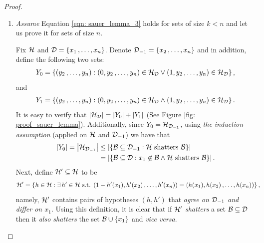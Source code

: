 \documentclass[11pt]{article}
\begin{document}
\begin{itemize}
\begin{proof}
\begin{enumerate}
\item  \emph{Assume} Equation \eqref{eqn: sauer_lemma_3} holds for sets of size $k < n$ and let us prove it for sets of size $n$. 

Fix ${\mathcal H}$ and ${\mathcal D} = \left\{x_1 \,{,}\ldots{,}\, x_n\right\}$. Denote ${\mathcal D}_{-1} = \left\{x_2 \,{,}\ldots{,}\, x_n\right\}$ and in addition, define the
following two sets:
\begin{align*}
Y_{0} = \left\{(y_2 \,{,}\ldots{,}\, y_n): (0, y_2 \,{,}\ldots{,}\, y_n) \in {\mathcal H}_{{\mathcal D}} \lor  (1, y_2 \,{,}\ldots{,}\, y_n) \in {\mathcal H}_{{\mathcal D}}\right\},
\end{align*}
and
\begin{align*}
Y_{1} = \left\{(y_2 \,{,}\ldots{,}\, y_n): (0, y_2 \,{,}\ldots{,}\, y_n) \in {\mathcal H}_{{\mathcal D}} \land  (1, y_2 \,{,}\ldots{,}\, y_n) \in {\mathcal H}_{{\mathcal D}}\right\}.
\end{align*}
It is easy to verify that $\left\lvert {\mathcal H}_{{\mathcal D}} \right\rvert = \left\lvert Y_0 \right\rvert + \left\lvert Y_1 \right\rvert$ (See Figure \ref{fig: proof_sauer_lemma}). Additionally, since $Y_0 = {\mathcal H}_{{\mathcal D}_{-1}}$, using \emph{the induction assumption} (applied on ${\mathcal H}$ and ${\mathcal D}_{-1}$) we have that
\begin{align*}
\left\lvert Y_0 \right\rvert = \left\lvert {\mathcal H}_{{\mathcal D}_{-1}} \right\rvert &\le \left\lvert \left\{{\mathcal B} \subseteq {\mathcal D}_{-1}: {\mathcal H}\text{ shatters }{\mathcal B}\right\} \right\rvert \\
&=  \left\lvert \left\{{\mathcal B} \subseteq {\mathcal D}: x_1 \not\in {\mathcal B} \land {\mathcal H}\text{ shatters }{\mathcal B}\right\} \right\rvert.
\end{align*}
Next, define ${\mathcal H}' \subseteq {\mathcal H}$ to be
\begin{align*}
{\mathcal H}'  &= \left\{h \in {\mathcal H} : \exists\,h' \in {\mathcal H}\text{ s.t. }(1 - h'(x_1), h'(x_2) \,{,}\ldots{,}\, h'(x_n)) = (h(x_1), h(x_2)  \,{,}\ldots{,}\, h(x_n)) \right\},
\end{align*}
namely, ${\mathcal H}'$ contains pairs of hypotheses $(h, h')$ that \emph{agree on ${\mathcal D}_{-1}$ and differ on $x_1$}. Using this definition, it is clear that if ${\mathcal H}'$ \emph{shatters} a set ${\mathcal B} \subseteq {\mathcal D}$ then it \emph{also shatters} the set ${\mathcal B} \cup \left\{x_1\right\}$ and \emph{vice versa}. 


\end{enumerate}
\end{proof}
\end{itemize}
\end{document}
